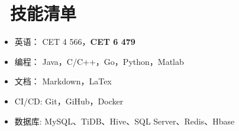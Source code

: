\documentclass{resume}
\begin{document}
\section{\faCogs\ 技能清单}
\begin{itemize}[parsep=0.5ex]
  \item 英语：		CET 4 566，\textbf{CET 6 479}
  \item 编程：		Java，C/C++，Go，Python，Matlab
  \item 文档：		Markdown，LaTex
  \item CI/CD:		Git，GiHub，Docker
  \item 数据库:		MySQL、TiDB、Hive、SQL Server、Redis、Hbase
  
\end{itemize}



%
%
\end{document}
